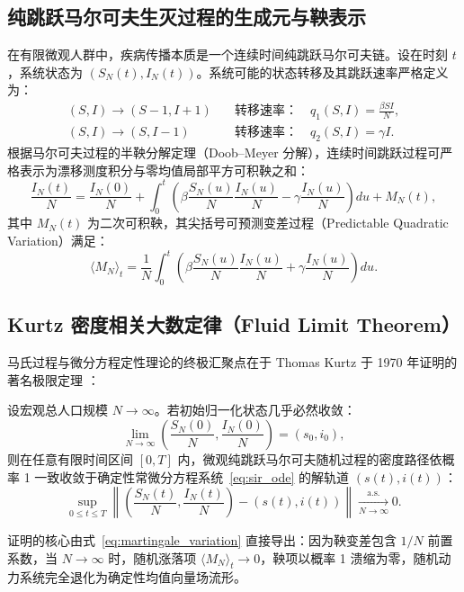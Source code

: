 \subsection{纯跳跃马尔可夫生灭过程的生成元与鞅表示}
在有限微观人群中，疾病传播本质是一个连续时间纯跳跃马尔可夫链。设在时刻 $t$，系统状态为 $(S_N(t), I_N(t))$。系统可能的状态转移及其跳跃速率严格定义为：
\begin{align}
(S, I) \to (S-1, I+1) \quad &\text{转移速率：} \quad q_1(S, I) = \frac{\beta S I}{N}, \\
(S, I) \to (S, I-1) \quad &\text{转移速率：} \quad q_2(S, I) = \gamma I.
\end{align}
根据马尔可夫过程的半鞅分解定理（Doob--Meyer 分解），连续时间跳跃过程可严格表示为漂移测度积分与零均值局部平方可积鞅之和：
\begin{equation}
\frac{I_N(t)}{N} = \frac{I_N(0)}{N} + \int_0^t \left( \beta \frac{S_N(u)}{N} \frac{I_N(u)}{N} - \gamma \frac{I_N(u)}{N} \right) du + M_N(t), \label{eq:semimartingale}
\end{equation}
其中 $M_N(t)$ 为二次可积鞅，其尖括号可预测变差过程（Predictable Quadratic Variation）满足：
\begin{equation}
\langle M_N \rangle_t = \frac{1}{N} \int_0^t \left( \beta \frac{S_N(u)}{N} \frac{I_N(u)}{N} + \gamma \frac{I_N(u)}{N} \right) du. \label{eq:martingale_variation}
\end{equation}

\subsection{Kurtz 密度相关大数定律（Fluid Limit Theorem）}
马氏过程与微分方程定性理论的终极汇聚点在于 Thomas Kurtz 于 1970 年证明的著名极限定理 \citep{kurtz1970solutions,kurtz1971limit,ethier1986markov}：
\begin{theorem}\label{thm:kurtz}
设宏观总人口规模 $N \to \infty$。若初始归一化状态几乎必然收敛：
\begin{equation}
\lim_{N \to \infty} \left( \frac{S_N(0)}{N}, \frac{I_N(0)}{N} \right) = (s_0, i_0),
\end{equation}
则在任意有限时间区间 $[0, T]$ 内，微观纯跳跃马尔可夫随机过程的密度路径依概率 1 一致收敛于确定性常微分方程系统~\eqref{eq:sir_ode} 的解轨道 $(s(t), i(t))$：
\begin{equation}
\sup_{0 \le t \le T} \left\| \left( \frac{S_N(t)}{N}, \frac{I_N(t)}{N} \right) - (s(t), i(t)) \right\| \xrightarrow[N \to \infty]{\text{a.s.}} 0.
\end{equation}
\end{theorem}
证明的核心由式~\eqref{eq:martingale_variation} 直接导出：因为鞅变差包含 $1/N$ 前置系数，当 $N \to \infty$ 时，随机涨落项 $\langle M_N \rangle_t \to 0$，鞅项以概率 1 溃缩为零，随机动力系统完全退化为确定性均值向量场流形。

